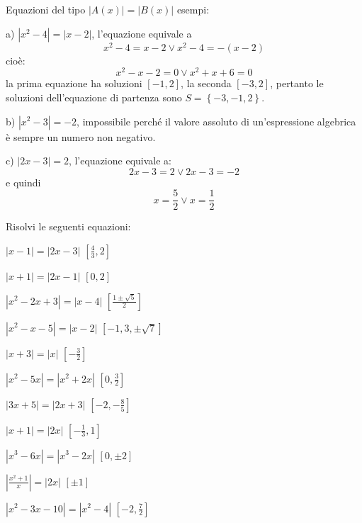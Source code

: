 \begin{esercizio}\label{ese:03.1}
Equazioni del tipo $|A(x)|=|B(x)|$ esempi:
\begin{enumeratea}
\item[a)] $|x^2-4|=|x-2|$, l'equazione equivale a
$$x^2-4=x-2 \vee x^2-4=-(x-2)$$
cioè:
$$x^2-x-2=0 \vee x^2+x+6=0$$la prima equazione ha soluzioni $[-1, 2]$, 
la seconda $[-3, 2]$, pertanto le soluzioni dell'equazione di partenza sono 
$S=\left\lbrace -3, -1, 2\right\rbrace $.

\item[b)] $|x^2-3|=-2$, impossibile perché il valore assoluto di 
un'espressione algebrica è sempre un numero non negativo.
\item[c)] $|2x-3|=2$, l'equazione equivale a:
$$2x-3=2 \vee 2x-3=-2$$
e quindi
$$x=\frac{5}{2}\vee x=\frac{1}{2}$$
\end{enumeratea}

\noindent Risolvi le seguenti equazioni:

\begin{multicols}{2}
\begin{enumeratea}
\item $\left| x-1\right| =\left| 2x-3\right| $ \hfill $\left[ \frac{4}{3}, 
2\right] $
\item $\left| x+1\right| =\left| 2x-1\right| $ \hfill $\left[ 0, 2\right] $
\item $\left| x^2-2x+3 \right| =\left| x-4 \right| $ \hfill $\left[ 
\frac{1\pm\sqrt{5}}{2}\right] $
\item $\left| x^2-x-5\right| =\left| x-2\right| $ \hfill $\left[ -1, 3, \pm 
\sqrt{7}\right] $
\item $\left| x+3\right| =\left| x\right| $ \hfill $\left[ -\frac{3}{2} \right] 
$
\item $\left| x^2-5x \right| =\left| x^2+2x \right| $ \hfill $\left[ 0, 
\frac{3}{2} \right] $
\item $\left| 3x+5\right| =\left| 2x+3\right| $ \hfill $\left[-2, -\frac{8}{5} 
\right] $
\item $\left| x+1\right| =\left| 2x\right| $ \hfill $\left[ -\frac{1}{3}, 1 
\right] $
\item $\left| x^3-6x\right| =\left| x^3-2x\right| $ \hfill $\left[ 0, \pm 2 
\right] $
\item $\left|\frac{x^2+1}{x}\right| =\left| 2x\right| $ \hfill $\left[ \pm 1 
\right] $
\item $\left| x^2-3x-10\right| =\left| x^2-4\right| $ \hfill $\left[-2, 
\frac{7}{2} \right] $
\end{enumeratea}
\end{multicols}
\end{esercizio}

